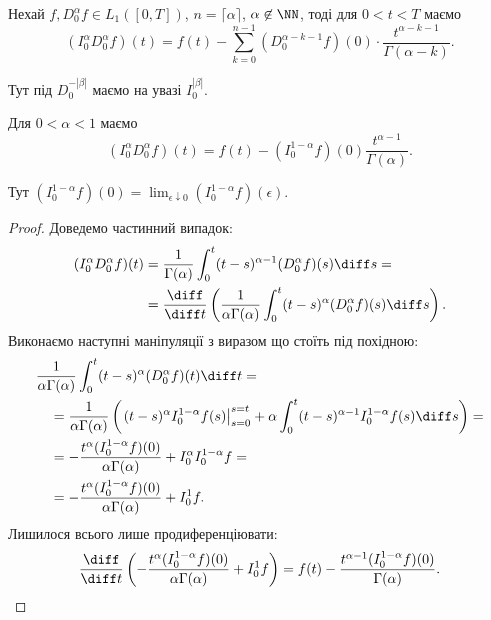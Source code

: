 \begin{proposition}
    Нехай $f, D_0^\alpha f \in L_1([0,T])$, $n = \lceil \alpha \rceil$, $\alpha \not\in \NN$, тоді для $0 < t < T$ маємо
    \begin{equation}
        (I_0^\alpha D_0^\alpha f)(t) = f(t) - \sum_{k = 0}^{n - 1} (D_0^{\alpha - k  - 1} f)(0) \cdot \frac{t^{\alpha - k - 1}}{\Gamma(\alpha - k)}.
    \end{equation}
\end{proposition}
\begin{remark}
    Тут під $D_0^{-|\beta|}$ маємо на увазі $I_0^{|\beta|}$.
\end{remark}
\begin{example}
    Для $0 < \alpha < 1$ маємо
    \begin{equation}
        (I_0^\alpha D_0^\alpha f)(t) = f(t) - (I_0^{1 - \alpha} f)(0) \frac{t^{\alpha - 1}}{\Gamma(\alpha)}.
    \end{equation}
\end{example}
\begin{remark}
    Тут $(I_0^{1 - \alpha} f)(0) = \lim_{\epsilon \downarrow 0} (I_0^{1 - \alpha} f)(\epsilon)$.
\end{remark}
\begin{proof}
    Доведемо частинний випадок:
    \begin{equation}
        \begin{aligned}
            (I_0^\alpha D_0^\alpha f)(t) 
            &= \frac{1}{\Gamma(\alpha)} \int_0^t (t - s)^{\alpha - 1} (D_0^\alpha f) (s) \diff s = \\
            &= \frac{\diff}{\diff t} \left( \frac{1}{\alpha \Gamma(\alpha)} \int_0^t (t - s)^{\alpha} (D_0^\alpha f) (s) \diff s \right).
        \end{aligned}
    \end{equation}
    Виконаємо наступні маніпуляції з виразом що стоїть під похідною:
    \begin{equation}
        \begin{aligned}
            & \frac{1}{\alpha \Gamma(\alpha)} \int_0^t (t - s)^{\alpha} (D_0^\alpha f) (t) \diff t = \\
            &\quad = \frac{1}{\alpha \Gamma(\alpha)} \left( \left. (t - s)^{\alpha} I_0^{1-\alpha} f (s) \right|_{s = 0}^{s = t} + \alpha \int_0^t (t - s)^{\alpha - 1} I_0^{1-\alpha} f(s) \diff s \right) = \\
            &\quad = - \frac{t^\alpha (I_0^{1 - \alpha} f)(0)}{\alpha \Gamma(\alpha)} + I_0^\alpha I_0^{1-\alpha} f = \\
            &\quad = - \frac{t^\alpha (I_0^{1 - \alpha} f)(0)}{\alpha \Gamma(\alpha)} + I_0^1 f.
        \end{aligned}
    \end{equation}
    Лишилося всього лише продиференціювати:
    \begin{equation}
        \frac{\diff}{\diff t} \left( - \frac{t^\alpha (I_0^{1 - \alpha} f)(0)}{\alpha \Gamma(\alpha)} + I_0^1 f \right) = f(t) - \frac{t^{\alpha - 1} (I_0^{1-\alpha} f)(0)}{\Gamma(\alpha)}.
    \end{equation}
\end{proof}

